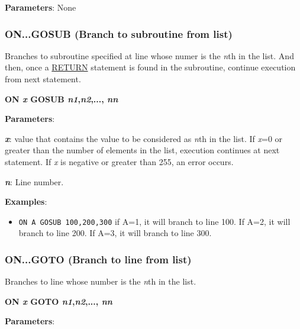     \textbf{Parameters}: None

    \subsubsection{{ON...GOSUB (Branch to subroutine from list)}}
    \label{msbasic:lang:ongosub}
    Branches to subroutine specified at line whose numer is the \textit{n}th in
    the list. And then, once a \hyperref[msbasic:lang:return]{RETURN} statement
    is found in the subroutine, continue execution from next statement.

    \hspace{1.9cm}\textbf{ON \textit{x} GOSUB \textit{n1},\textit{n2},...,
    \textit{nn}}

    \textbf{Parameters}:

    \hspace{1cm}\textbf{\textit{x}}: value that contains the value to be
    considered as \textit{n}th in the list. If \textit{x}=0 or greater than the
    number of elements in the list, execution continues at next statement. If
    \textit{x} is negative or greater than 255, an error occurs.

    \hspace{1cm}\textbf{\textit{n}}: Line number.

    \textbf{Examples}:
    \begin{itemize}
        \item \texttt{ON A GOSUB 100,200,300} if A=1, it will branch to line
        100. If A=2, it will branch to line 200. If A=3, it will branch to line
        300.
    \end{itemize}

    \subsubsection{{ON...GOTO (Branch to line from list)}}
    \label{msbasic:lang:ongoto}
    Branches to line whose number is the \textit{n}th in the list.

    \hspace{1.9cm}\textbf{ON \textit{x} GOTO \textit{n1},\textit{n2},...,
    \textit{nn}}

    \textbf{Parameters}:

